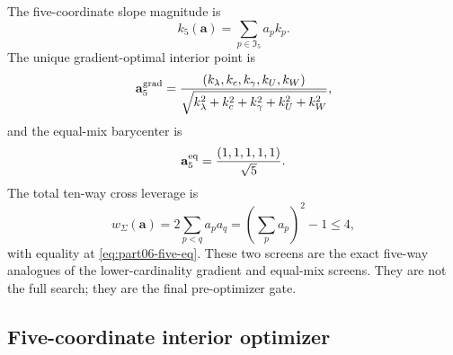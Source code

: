 The five-coordinate slope magnitude is
\begin{equation}
\label{eq:part06-five-slope}
k_5(\mathbf a)=\sum_{p\in\mathfrak I_5}a_pk_p.
\end{equation}
The unique gradient-optimal interior point is
\begin{equation}
\label{eq:part06-five-grad}
\mathbf a_5^{\rm grad}
=
\frac{(k_\lambda,k_c,k_\gamma,k_U,k_W)}{\sqrt{k_\lambda^2+k_c^2+k_\gamma^2+k_U^2+k_W^2}},
\end{equation}
and the equal-mix barycenter is
\begin{equation}
\label{eq:part06-five-eq}
\mathbf a_5^{\rm eq}=\frac{(1,1,1,1,1)}{\sqrt5}.
\end{equation}
The total ten-way cross leverage is
\begin{equation}
\label{eq:part06-five-cross-leverage}
w_\Sigma(\mathbf a)=2\sum_{p<q}a_pa_q=\left(\sum_pa_p\right)^2-1\le4,
\end{equation}
with equality at \eqref{eq:part06-five-eq}.  These two screens are the exact five-way analogues of the lower-cardinality gradient and equal-mix screens.  They are not the full search; they are the final pre-optimizer gate.

\subsection{Five-coordinate interior optimizer}
\label{subsec:part06-five-coordinate-interior-optimizer}

